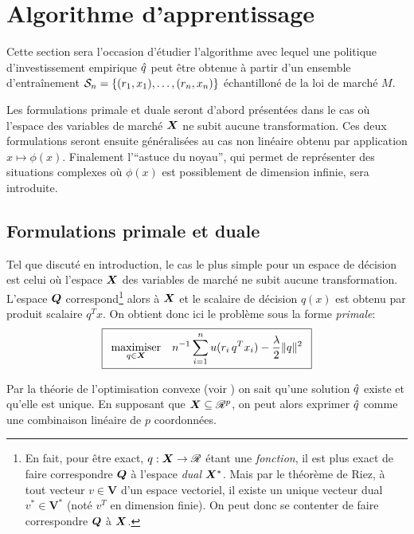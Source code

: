 \section{Algorithme d'apprentissage}
\label{sec:algap}

Cette section sera l'occasion d'étudier l'algorithme avec lequel une politique
d'investissement empirique $\qh$ peut être obtenue à partir d'un ensemble d'entraînement
$\S_n = \{(r_1,x_1),\ldots,(r_n,x_n)\}$ échantilloné de la loi de marché $M$.

Les formulations primale et duale seront d'abord présentées dans le cas où l'espace des
variables de marché $\X$ ne subit aucune transformation. Ces deux formulations seront
ensuite généralisées au cas non linéaire obtenu par application $x \mapsto \phi(x)$. Finalement
l'``astuce du noyau'', qui permet de représenter des situations complexes où $\phi(x)$ est
possiblement de dimension infinie, sera introduite. 


\subsection{Formulations primale et duale}

Tel que discuté en introduction, le cas le plus simple pour un espace de décision est
celui où l'espace $\X$ des variables de marché ne subit aucune transformation. L'espace
$\Q$ correspond\footnote{En fait, pour être exact, $q : \X \to \Re$ étant une
  \textit{fonction}, il est plus exact de faire correspondre $\Q$ à l'espace \textit{dual}
  $\X^*$. Mais par le théorème de Riez, à tout vecteur $v \in \bm V$ d'un espace vectoriel,
  il existe un unique vecteur dual $v^* \in \bm V^*$ (noté $v^T$ en dimension finie). On
  peut donc se contenter de faire correspondre $\Q$ à $\X$.} alors à $\X$ et le scalaire
de décision $q(x)$ est obtenu par produit scalaire $q^Tx$. On obtient donc ici le problème
sous la forme \textit{primale}:
{\begin{equation}
  \boxed{
  \maximizeEquation[q\in\X]{n^{-1}\sumi u(r_i\,q^Tx_i) - \frac{\lambda}{2}\|q\|^2}}
\end{equation}
\vspace{-\baselineskip}}

Par la théorie de l'optimisation convexe (voir \cite{boyd2004convex}) on sait qu'une
solution $\qh$ existe et qu'elle est unique. En supposant que $\X \subseteq \Re^p$, on peut alors
exprimer $\qh$ comme une combinaison linéaire de $p$ coordonnées.

